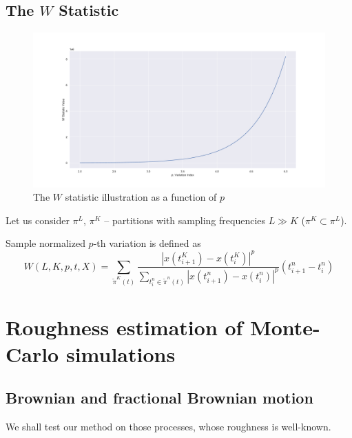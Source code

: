     \subsection{The $W$ Statistic}
        \begin{figure}[htbp]
            \centering
            \includegraphics[width=\linewidth]{fig/W Stat Illustration.pdf}
            \caption{The $W$ statistic illustration as a function of $p$}
        \end{figure}

        Let us consider $\pi^L$, $\pi^K$ -- partitions with sampling frequencies $L\gg K$ ($\pi^K \subset \pi^L$).
        \begin{definition}
            Sample normalized $p$-th variation is defined as
            \begin{equation}
                W(L, K, p, t, X) = \sum_{\tilde\pi^K(t)}\frac{\left|x(t_{i+1}^K) - x(t_i^K)\right|^p}{\sum_{t_i^n \in \tilde\pi^n(t)} \left|x(t_{i+1}^n) - x(t_i^n)\right|^p} (t_{i+1}^n-t_{i}^n)
            \end{equation}
        \end{definition}

\section{Roughness estimation of Monte-Carlo simulations}

    \subsection{Brownian and fractional Brownian motion}
        We shall test our method on those processes, whose roughness is well-known.

